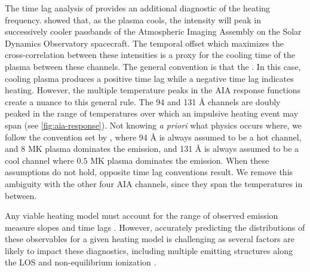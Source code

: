 The time lag analysis of \citet{viall_evidence_2012} provides an additional diagnostic of the heating frequency. \citet{viall_patterns_2011} showed that, as the plasma cools, the intensity will peak in successively cooler passbands of the Atmospheric Imaging Assembly \citep[AIA,][]{lemen_atmospheric_2012} on the Solar Dynamics Observatory \citep[SDO,][]{pesnell_solar_2012} spacecraft.
The temporal offset which maximizes the cross-correlation between these intensities is a proxy for the cooling time of the plasma between these channels.
The general convention is that the .
In this case, cooling plasma produces a positive time lag while a negative time lag indicates heating.
However, the multiple temperature peaks in the AIA response functions create a nuance to this general rule.
The 94 and 131 \AA{} channels are doubly peaked in the range of temperatures over which an impulsive heating event may span (see \autoref{fig:aia-response}).
Not knowing \textit{a priori} what physics occurs where, we follow the convention set by \citet{viall_evidence_2012}, where 94 \AA{} is always assumed to be a hot channel, and $8$ MK plasma dominates the emission, and 131 \AA{} is always assumed to be a cool channel where $0.5$ MK plasma dominates the emission.
When these assumptions do not hold, opposite time lag conventions result.
We remove this ambiguity with the other four AIA channels, since they span the temperatures in between. 

Any viable heating model must account for the range of observed emission measure slopes and time lags \citep[ hereafter]{viall_survey_2017}.
However, accurately predicting the distributions of these observables for a given heating model is challenging as several factors are likely to impact these diagnostics, including multiple emitting structures along the LOS and non-equilibrium ionization \citep[e.g.][]{barnes_inference_2016}.

